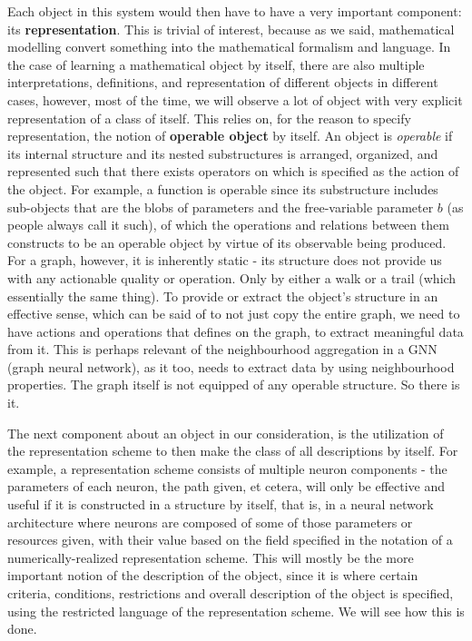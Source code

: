 Each object in this system would then have to have a very important component: its \textbf{representation}. This is trivial of interest, because as we said, mathematical modelling convert something into the mathematical formalism and language. In the case of learning a mathematical object by itself, there are also multiple interpretations, definitions, and representation of different objects in different cases, however, most of the time, we will observe a lot of object with very explicit representation of a class of itself. This relies on, for the reason to specify representation, the notion of \textbf{operable object} by itself. An object is \textit{operable} if its internal structure and its nested substructures is arranged, organized, and represented such that there exists operators on which is specified as the action of the object. For example, a function is operable since its substructure includes sub-objects that are the blobs of parameters and the free-variable parameter $b$ (as people always call it such), of which the operations and relations between them constructs to be an operable object by virtue of its observable being produced. For a graph, however, it is inherently static - its structure does not provide us with any actionable quality or operation. Only by either a walk or a trail (which essentially the same thing). To provide or extract the object's structure in an effective sense, which can be said of to not just copy the entire graph, we need to have actions and operations that defines on the graph, to extract meaningful data from it. This is perhaps relevant of the neighbourhood aggregation in a GNN (graph neural network), as it too, needs to extract data by using neighbourhood properties. The graph itself is not equipped of any operable structure. So there is it. 

The next component about an object in our consideration, is the utilization of the representation scheme to then make the class of all descriptions by itself. For example, a representation scheme consists of multiple neuron components - the parameters of each neuron, the path given, et cetera, will only be effective and useful if it is constructed in a structure by itself, that is, in a neural network architecture where neurons are composed of some of those parameters or resources given, with their value based on the field specified in the notation of a numerically-realized representation scheme. This will mostly be the more important notion of the description of the object, since it is where certain criteria, conditions, restrictions and overall description of the object is specified, using the restricted language of the representation scheme. We will see how this is done. 

